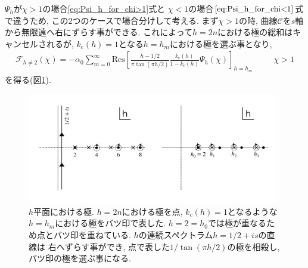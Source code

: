 $\Psi_h$が$\chi > 1$の場合\eqref{eq:Psi_h_for_chi>1}式と
$\chi < 1$の場合$\eqref{eq:Psi_h_for_chi<1}$式で違うため, この2つのケースで場合分けして考える. 
まず$\chi > 1$の時, 曲線$\mathcal{C}$を$s$軸から無限遠へ右にずらす事ができる. 
これによって$h = 2n$における極の総和はキャンセルされるが, 
$k_c(h) = 1$となる$h = h_m$における極を選ぶ事となり, 
\begin{align}
	\mathcal{F}_{h\neq 2}(\chi)
	= -\alpha_0\sum_{m=0}^{\infty}\mathrm{Res}\left[
		\frac{h - 1/2}{\pi\tan(\pi h / 2)}\frac{k_c(h)}{1 - k_c(h)}\Psi_h(\chi)
	\right]_{h=h_m}
	\hspace{30pt}\chi > 1
\end{align}
を得る(図\ref{fig:poles}). 
\begin{figure}[ht]
	\centering
	\includegraphics[width=11cm]{figures/poles}
	\caption{$h$平面における極. $h = 2n$における極を点, $k_c(h) = 1$となるような
	$h = h_m$における極をバツ印で表した. $h = 2 = h_0$では極が重なるため点とバツ印を重ねている. 
	$h$の連続スペクトラム$h = 1/2 + is$の直線は
	右へずらす事ができ, 点で表した$1/\tan(\pi h/2)$の極を相殺し, バツ印の極を選ぶ事になる. }
	\label{fig:poles}
\end{figure}

